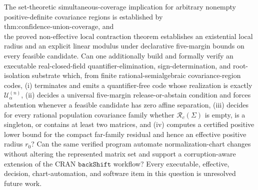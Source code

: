 The set-theoretic simultaneous-coverage implication for arbitrary nonempty positive-definite covariance regions is established by \(\text{thm:confidence-union-coverage}\), and \(\text{the proved non-effective local contraction theorem}\) establishes an existential local radius and an explicit linear modulus under declarative five-margin bounds on every feasible candidate. Can one additionally build and formally verify an executable real-closed-field quantifier-elimination, sign-determination, and root-isolation substrate which, from finite rational-semialgebraic covariance-region codes, (i) terminates and emits a quantifier-free code whose realization is exactly \(\mathcal U^{(n)}_\alpha\), (ii) decides a universal five-margin release-or-abstain condition and forces abstention whenever a feasible candidate has zero affine separation, (iii) decides for every rational population covariance family whether \(\mathcal R_c(\Sigma)\) is empty, is a singleton, or contains at least two matrices, and (iv) computes a certified positive lower bound for the compact far-family residual and hence an effective positive radius \(r_0\)? Can the same verified program automate normalization-chart changes without altering the represented matrix set and support a corruption-aware extension of the CRAN \(\texttt{backShift}\) workflow? Every executable, effective, decision, chart-automation, and software item in this question is unresolved future work.